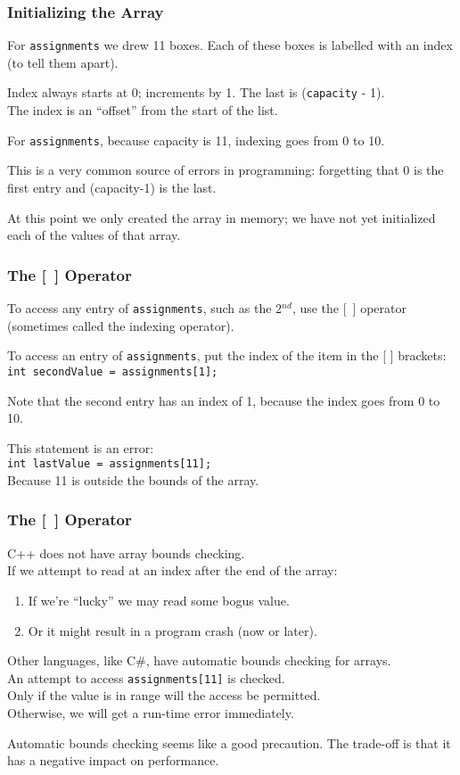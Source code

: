 \begin{frame}
\frametitle{Initializing the Array}

For \texttt{assignments} we drew 11 boxes. Each of these boxes is labelled with an index (to tell them apart).

Index always starts at 0; increments by 1. The last is (\texttt{capacity} - 1).\\
\quad The index is an ``offset'' from the start of the list.

For \texttt{assignments}, because capacity is 11, indexing goes from 0 to 10.

This is a very common source of errors in programming: forgetting that 0 is the first entry and (capacity-1) is the last.

At this point we only created the array in memory; we have not yet initialized each of the values of that array.

\end{frame}

\begin{frame}
\frametitle{The [~] Operator}

To access any entry of \texttt{assignments}, such as the  2$^{nd}$, use the [~] operator (sometimes called the \alert{indexing operator}).

To access an entry of \texttt{assignments}, put the index of the item in the [ ] brackets: \texttt{int secondValue = assignments[1];}

Note that the second entry has an index of 1, because the index goes from 0 to 10.

This statement is an error:\\
\texttt{int lastValue = assignments[11];}\\
\quad Because 11 is outside the bounds of the array.

\end{frame}

\begin{frame}
\frametitle{The [~] Operator}

C++ does not have array bounds checking.\\
\quad If we attempt to read at an index after the end of the array:\\
\begin{enumerate}
	\item If we're ``lucky'' we may read some bogus value.\\
	\item Or it might result in a program crash (now or later).
\end{enumerate}

Other languages, like C\#, have automatic bounds checking for arrays.\\
\quad An attempt to access \texttt{assignments[11]} is checked.\\
\quad Only if the value is in range will the access be permitted.\\
\quad Otherwise, we will get a run-time error immediately.


Automatic bounds checking seems like a good precaution. The trade-off is that it has a negative impact on performance.

\end{frame}


